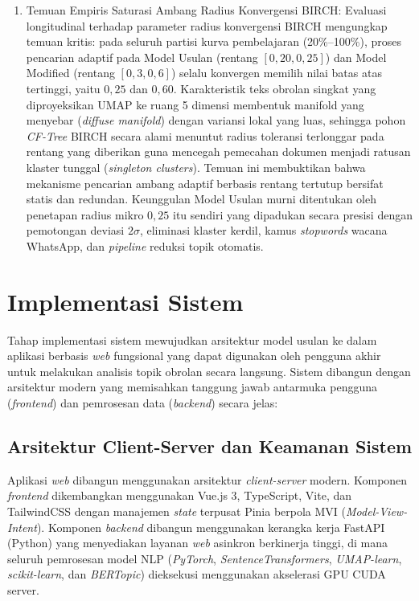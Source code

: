 \begin{enumerate}[label=\alph*., leftmargin=*, itemsep=4pt]
    \item Temuan Empiris Saturasi Ambang Radius Konvergensi BIRCH:
    Evaluasi longitudinal terhadap parameter radius konvergensi BIRCH mengungkap temuan kritis: pada seluruh partisi kurva pembelajaran (20\%--100\%), proses pencarian adaptif pada Model Usulan (rentang $[0{,}20, 0{,}25]$) dan Model Modified (rentang $[0{,}3, 0{,}6]$) selalu konvergen memilih nilai batas atas tertinggi, yaitu $0{,}25$ dan $0{,}60$. Karakteristik teks obrolan singkat yang diproyeksikan UMAP ke ruang 5 dimensi membentuk manifold yang menyebar (\textit{diffuse manifold}) dengan variansi lokal yang luas, sehingga pohon \textit{CF-Tree} BIRCH secara alami menuntut radius toleransi terlonggar pada rentang yang diberikan guna mencegah pemecahan dokumen menjadi ratusan klaster tunggal (\textit{singleton clusters}). Temuan ini membuktikan bahwa mekanisme pencarian ambang adaptif berbasis rentang tertutup bersifat statis dan redundan. Keunggulan Model Usulan murni ditentukan oleh penetapan radius mikro $0{,}25$ itu sendiri yang dipadukan secara presisi dengan pemotongan deviasi $2\sigma$, eliminasi klaster kerdil, kamus \textit{stopwords} wacana WhatsApp, dan \textit{pipeline} reduksi topik otomatis.
\end{enumerate}

\section{Implementasi Sistem}
\label{sec:system-implementation-results}

Tahap implementasi sistem mewujudkan arsitektur model usulan ke dalam aplikasi berbasis \textit{web} fungsional yang dapat digunakan oleh pengguna akhir untuk melakukan analisis topik obrolan secara langsung. Sistem dibangun dengan arsitektur modern yang memisahkan tanggung jawab antarmuka pengguna (\textit{frontend}) dan pemrosesan data (\textit{backend}) secara jelas:

\subsection{Arsitektur Client-Server dan Keamanan Sistem}
\label{subsec:client-server-security}

Aplikasi \textit{web} dibangun menggunakan arsitektur \textit{client-server} modern. Komponen \textit{frontend} dikembangkan menggunakan Vue.js 3, TypeScript, Vite, dan TailwindCSS dengan manajemen \textit{state} terpusat Pinia berpola MVI (\textit{Model-View-Intent}). Komponen \textit{backend} dibangun menggunakan kerangka kerja FastAPI (Python) yang menyediakan layanan \textit{web} asinkron berkinerja tinggi, di mana seluruh pemrosesan model NLP (\textit{PyTorch}, \textit{SentenceTransformers}, \textit{UMAP-learn}, \textit{scikit-learn}, dan \textit{BERTopic}) dieksekusi menggunakan akselerasi GPU CUDA server.

